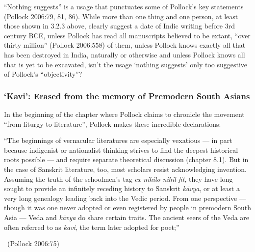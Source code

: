 “Nothing suggests” is a usage that punctuates some of Pollock’s key statements (Pollock 2006:79, 81, 86). While more than one thing and one person, at least those shown in 3.2.3 above, clearly suggest a date of Indic writing before 3rd century BCE, unless Pollock has read all manuscripts believed to be extant, “over thirty million” (Pollock 2006:558) of them, unless Pollock knows exactly all that has been destroyed in India, naturally or otherwise and unless Pollock knows all that is yet to be excavated, isn’t the usage ‘nothing suggests’ only too suggestive of Pollock’s “objectivity”?

\vspace{-.4cm}

\subsubsection{‘Kavi’: Erased from the memory of Premodern South Asians}

In the beginning of the chapter where Pollock claims to chronicle the movement “from liturgy to literature”, Pollock makes these incredible declarations:

\begin{myquote}
“The beginnings of vernacular literatures are especially vexatious — in part because indigenist or nationalist thinking strives to find the deepest historical roots possible — and require separate theoretical discussion (chapter 8.1). But in the case of Sanskrit literature, too, most scholars resist acknowledging invention. Assuming the truth of the schoolmen’s tag \textit{ex nihilo nihil fit}, they have long sought to provide an infinitely receding history to Sanskrit \textit{kāvya}, or at least a very long genealogy leading back into the Vedic period. From one perspective — though it was one never adopted or even registered by people in premodern South Asia — Veda and \textit{kāvya} do share certain traits. The ancient seers of the Veda are often referred to as \textit{kavi}, the term later adopted for poet;” 

~\hfill (Pollock 2006:75)
\end{myquote}

